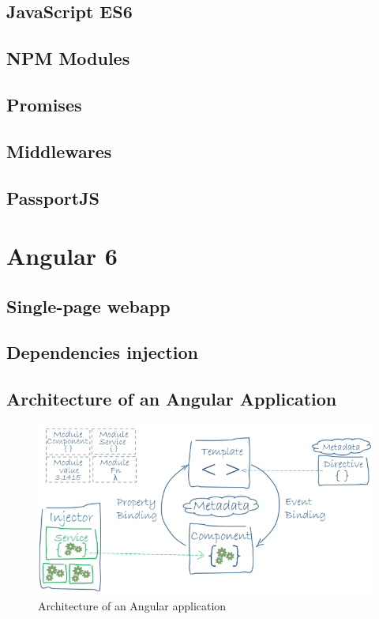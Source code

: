 \documentclass[11pt,a4paper]{report}
\begin{document}
\subsection{JavaScript ES6}
\subsection{NPM Modules}
\subsection{Promises}
\subsection{Middlewares}
\subsection{PassportJS}

\section{Angular 6}
\subsection{Single-page webapp}
\subsection{Dependencies injection}
\subsection{Architecture of an Angular Application}
\begin{figure}[H]
\begin{center}
	\includegraphics[width=.8\textwidth]{assets/angular_architecture}
	\caption{Architecture of an Angular application\cite{angular:ref:architecture}}
\end{center}
\end{figure}
\end{document}
